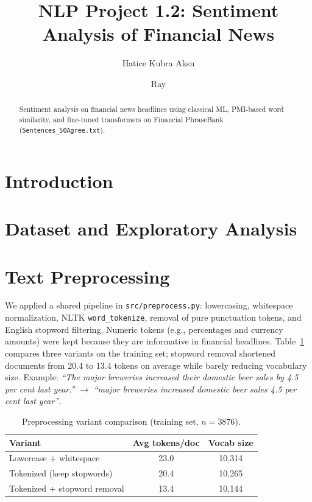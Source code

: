 \documentclass[sigconf,nonacm]{acmart}
\title{NLP Project 1.2: Sentiment Analysis of Financial News}
\author{Hatice Kubra Aksu}
\affiliation{%
  \institution{TU Berlin}
  \city{Berlin}
  \country{Germany}}
\author{Ray}
\affiliation{%
  \institution{TU Berlin}
  \city{Berlin}
  \country{Germany}}
\begin{document}
\begin{abstract}
Sentiment analysis on financial news headlines using classical ML, PMI-based
word similarity, and fine-tuned transformers on Financial PhraseBank
(\texttt{Sentences\_50Agree.txt}).
\end{abstract}


\maketitle

\section{Introduction}

\section{Dataset and Exploratory Analysis}

\section{Text Preprocessing}

We applied a shared pipeline in \texttt{src/preprocess.py}: lowercasing,
whitespace normalization, NLTK \texttt{word\_tokenize}, removal of pure
punctuation tokens, and English stopword filtering.
Numeric tokens (e.g., percentages and currency amounts) were kept because they
are informative in financial headlines.
Table~\ref{tab:preprocessing} compares three variants on the training set;
stopword removal shortened documents from 20.4 to 13.4 tokens on average while
barely reducing vocabulary size.
Example: \emph{``The major breweries increased their domestic beer sales by 4.5
per cent last year.''} $\rightarrow$ \emph{``major breweries increased domestic
beer sales 4.5 per cent last year''}.

\begin{table}[h]
  \caption{Preprocessing variant comparison (training set, $n=3876$).}
  \label{tab:preprocessing}
  \begin{tabular}{lcc}
    \toprule
    Variant & Avg tokens/doc & Vocab size \\
    \midrule
    Lowercase + whitespace & 23.0 & 10{,}314 \\
    Tokenized (keep stopwords) & 20.4 & 10{,}265 \\
    Tokenized + stopword removal & 13.4 & 10{,}144 \\
    \bottomrule
  \end{tabular}
\end{table}
\end{document}
